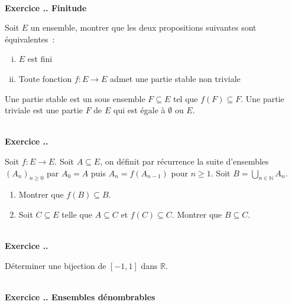 \documentclass{article}
\newcommand{\mb}[1]{\mathbb{#1}}
\newcounter{exo}
\newcommand{\exercice}[1][\null]{\textbf{\\ \large Exercice \thesection.\theexo. \normalsize #1} \addtocounter{exo}{1}}
\begin{document}
\exercice[Finitude]

Soit $E$ un ensemble, montrer que les deux propositions suivantes 
sont équivalentes~:

\begin{enumerate}[(i)]
    \item $E$ est fini
    \item Toute fonction $f : E \to E$ admet une partie stable non 
        triviale
\end{enumerate}

Une partie stable est un sous ensemble $F \subseteq E$ tel 
que $f(F) \subseteq F$. Une partie triviale est une partie $F$
de $E$ qui est égale à $\emptyset$ ou $E$.



\exercice 
Soit $f : E \rightarrow E$. Soit $A \subseteq E$, on définit par récurrence la suite d'ensembles $(A_n)_{n \ge 0}$ par $A_0 = A$ puis $A_n = f(A_{n-1})$ pour $n \ge 1$. Soit $\displaystyle B = \bigcup_{n \in \mb{N}} A_n$.

\begin{enumerate}

\item Montrer que $f(B) \subseteq B$.

\item Soit $C \subseteq E$ telle que $A \subseteq C$ et $f(C) \subseteq C$. Montrer que $B \subseteq C$.
\end{enumerate}




\exercice 

Déterminer une bijection de $[-1,1]$ dans $\mb{R}$.


\exercice[Ensembles dénombrables]
\end{document}
